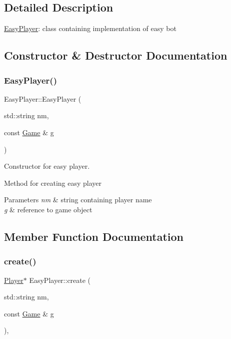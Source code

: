\subsection{Detailed Description}
\mbox{\hyperlink{class_easy_player}{Easy\+Player}}\+: class containing implementation of easy bot 

\subsection{Constructor \& Destructor Documentation}
\mbox{\label{class_easy_player_abf0692676d0bf3c0eb6f6741c621c7ec}} 
\subsubsection{\texorpdfstring{Easy\+Player()}{EasyPlayer()}}
{\footnotesize\ttfamily Easy\+Player\+::\+Easy\+Player (\begin{DoxyParamCaption}\item[{std\+::string}]{nm,  }\item[{const \mbox{\hyperlink{class_game}{Game}} \&}]{g }\end{DoxyParamCaption})}



Constructor for easy player. 

Method for creating easy player 
\begin{DoxyParams}{Parameters}
{\em nm} & string containing player name \\
\hline
{\em g} & reference to game object \\
\hline
\end{DoxyParams}


\subsection{Member Function Documentation}
\mbox{\label{class_easy_player_ae927ab9f7f4d152fd457e037ad7828a5}} 
\subsubsection{\texorpdfstring{create()}{create()}}
{\footnotesize\ttfamily \mbox{\hyperlink{class_player}{Player}}$\ast$ Easy\+Player\+::create (\begin{DoxyParamCaption}\item[{std\+::string}]{nm,  }\item[{const \mbox{\hyperlink{class_game}{Game}} \&}]{g }\end{DoxyParamCaption})\hspace{0.3cm}{\ttfamily [inline]}, {\ttfamily [virtual]}}


